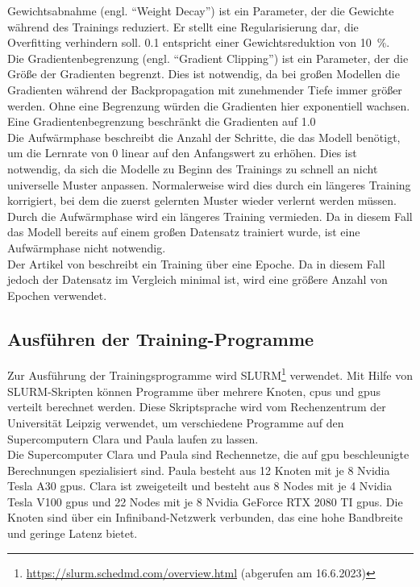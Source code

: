 Gewichtsabnahme (engl. \enquote{Weight Decay}) ist ein Parameter, der die Gewichte während des Trainings reduziert.
Er stellt eine Regularisierung dar, die Overfitting verhindern soll.
\SI{0,1}{} entspricht einer Gewichtsreduktion von \SI{10}{\percent}.\\

Die Gradientenbegrenzung (engl. \enquote{Gradient Clipping}) ist ein Parameter, der die Größe der Gradienten begrenzt.
Dies ist notwendig, da bei großen Modellen die Gradienten während der Backpropagation mit zunehmender Tiefe immer größer werden.
Ohne eine Begrenzung würden die Gradienten hier exponentiell wachsen.
Eine Gradientenbegrenzung beschränkt die Gradienten auf \SI{1,0}{}\\

Die Aufwärmphase beschreibt die Anzahl der Schritte, die das Modell benötigt, um die Lernrate von $0$ linear auf den Anfangswert zu erhöhen.
Dies ist notwendig, da sich die Modelle zu Beginn des Trainings zu schnell an nicht universelle Muster anpassen.
Normalerweise wird dies durch ein längeres Training korrigiert, bei dem die zuerst gelernten Muster wieder verlernt werden müssen.
Durch die Aufwärmphase wird ein längeres Training vermieden.
Da in diesem Fall das Modell bereits auf einem großen Datensatz trainiert wurde, ist eine Aufwärmphase nicht notwendig.\\

Der Artikel von \citet{llama} beschreibt ein Training über eine Epoche.
Da in diesem Fall jedoch der Datensatz im Vergleich minimal ist, wird eine größere Anzahl von Epochen verwendet.\\

\subsection{Ausführen der Training-Programme}\label{sec:approach:training}

Zur Ausführung der Trainingsprogramme wird SLURM\footnote{\url{https://slurm.schedmd.com/overview.html} (abgerufen am 16.6.2023)} verwendet.
Mit Hilfe von SLURM-Skripten können Programme über mehrere Knoten, \ac{cpu}s und \ac{gpu}s verteilt berechnet werden.
Diese Skriptsprache wird vom Rechenzentrum der Universität Leipzig verwendet, um verschiedene Programme auf den Supercomputern Clara und Paula laufen zu lassen.\\

Die Supercomputer Clara und Paula sind Rechennetze, die auf \ac{gpu} beschleunigte Berechnungen spezialisiert sind.
Paula besteht aus 12 Knoten mit je 8 Nvidia Tesla A30 \ac{gpu}s.
Clara ist zweigeteilt und besteht aus 8 Nodes mit je 4 Nvidia Tesla V100 \ac{gpu}s und 22 Nodes mit je 8 Nvidia GeForce RTX 2080 TI \ac{gpu}s.
Die Knoten sind über ein Infiniband-Netzwerk verbunden, das eine hohe Bandbreite und geringe Latenz bietet.\\

